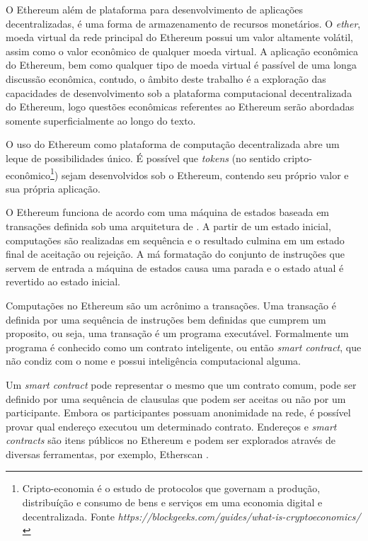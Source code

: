 \documentclass[tcc,capa]{texufpel}
\begin{document}
    O Ethereum além de plataforma para desenvolvimento de aplicações decentralizadas, é uma forma de armazenamento de recursos monetários. O \textit{ether}, moeda virtual da rede principal do Ethereum possui um valor altamente volátil, assim como o valor econômico de qualquer moeda virtual. A aplicação econômica do Ethereum, bem como qualquer tipo de moeda virtual é passível de uma longa discussão econômica, contudo, o âmbito deste trabalho é a exploração das capacidades de desenvolvimento sob a plataforma computacional decentralizada do Ethereum, logo questões econômicas referentes ao Ethereum serão abordadas somente superficialmente ao longo do texto.
    
    O uso do Ethereum como plataforma de computação decentralizada abre um leque de possibilidades único. É possível que \textit{tokens} (no sentido cripto-econômico\footnote{Cripto-economia é o estudo de protocolos que governam a produção, distribuíção e consumo de bens e serviços em uma economia digital e decentralizada. Fonte \textit{https://blockgeeks.com/guides/what-is-cryptoeconomics/}}) sejam desenvolvidos sob o Ethereum, contendo seu próprio valor e sua própria aplicação. 
    
    O Ethereum funciona de acordo com uma máquina de estados baseada em transações definida sob uma arquitetura de \bchain. A partir de um estado inicial, computações são realizadas em sequência e o resultado culmina em um estado final de aceitação ou rejeição. A má formatação do conjunto de instruções que servem de entrada a máquina de estados causa uma parada e o estado atual é revertido ao estado inicial.
    
    Computações no Ethereum são um acrônimo a transações. Uma transação é definida por uma sequência de instruções bem definidas que cumprem um proposito, ou seja, uma transação é um programa executável. Formalmente um programa é conhecido como um contrato inteligente, ou então \textit{smart contract}, que não condiz com o nome e possui inteligência computacional alguma. 
    
    Um \textit{smart contract} pode representar o mesmo que um contrato comum, pode ser definido por uma sequência de clausulas que podem ser aceitas ou não por um participante. Embora os participantes possuam anonimidade na rede, é possível provar qual endereço executou um determinado contrato. Endereços e \textit{smart contracts} são itens públicos no Ethereum e podem ser explorados através de diversas ferramentas, por exemplo, Etherscan \cite{team2017etherscan}.
    
\end{document}
